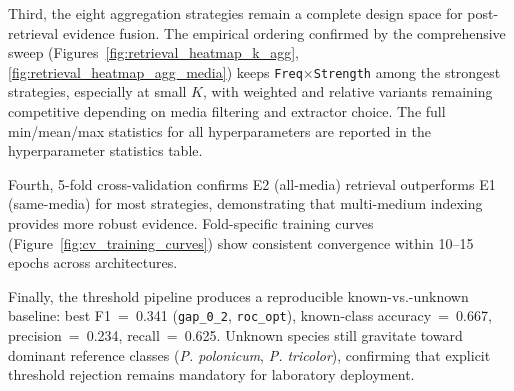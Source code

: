 Third, the eight aggregation strategies remain a complete design space for post-retrieval evidence fusion. The empirical ordering confirmed by the comprehensive sweep (Figures~\ref{fig:retrieval_heatmap_k_agg}, \ref{fig:retrieval_heatmap_agg_media}) keeps \texttt{Freq$\times$Strength} among the strongest strategies, especially at small $K$, with weighted and relative variants remaining competitive depending on media filtering and extractor choice. The full min/mean/max statistics for all hyperparameters are reported in the hyperparameter statistics table.

Fourth, 5-fold cross-validation confirms E2 (all-media) retrieval outperforms E1 (same-media) for most strategies, demonstrating that multi-medium indexing provides more robust evidence. Fold-specific training curves (Figure~\ref{fig:cv_training_curves}) show consistent convergence within 10--15 epochs across architectures.

Finally, the threshold pipeline produces a reproducible known-vs.-unknown baseline: best F1~=~0.341 (\texttt{gap\_0\_2}, \texttt{roc\_opt}), known-class accuracy~=~0.667, precision~=~0.234, recall~=~0.625. Unknown species still gravitate toward dominant reference classes (\emph{P. polonicum}, \emph{P. tricolor}), confirming that explicit threshold rejection remains mandatory for laboratory deployment.
